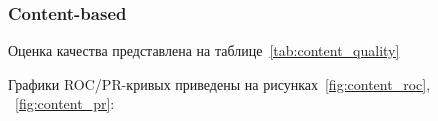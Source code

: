 \pagebreak

\subsubsection{Content-based}
Оценка качества представлена на таблице~\ref{tab:content_quality}

\begin{table}[h]
    \caption{Значения метрик}
    \label{tab:content_quality}
\end{table}

Графики ROC/PR-кривых приведены на рисунках~\ref{fig:content_roc}, ~\ref{fig:content_pr}:

